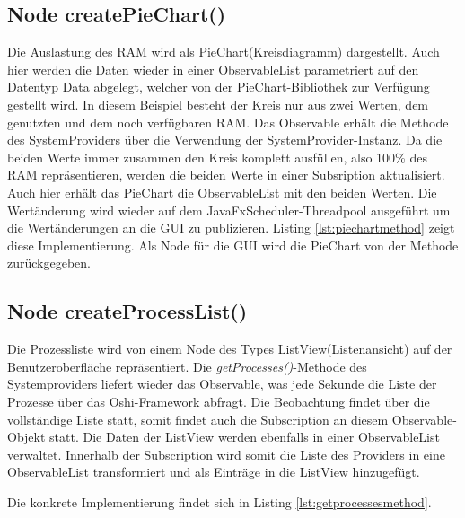 \subsection{Node createPieChart()}
Die Auslastung des RAM wird als PieChart(Kreisdiagramm) dargestellt. Auch hier werden die Daten wieder in einer ObservableList parametriert auf den Datentyp Data abgelegt, welcher von der PieChart-Bibliothek zur Verfügung gestellt wird. In diesem Beispiel besteht der Kreis nur aus zwei Werten, dem genutzten und dem noch verfügbaren RAM. Das Observable erhält die Methode des SystemProviders über die Verwendung der SystemProvider-Instanz. Da die beiden Werte immer zusammen den Kreis komplett ausfüllen, also 100\% des RAM repräsentieren, werden die beiden Werte in einer Subsription aktualisiert. Auch hier erhält das PieChart die ObservableList mit den beiden Werten. Die Wertänderung wird wieder auf dem JavaFxScheduler-Threadpool ausgeführt um die Wertänderungen an die GUI zu publizieren. Listing \ref{lst:piechartmethod} zeigt diese Implementierung. Als Node für die GUI wird die PieChart von der Methode zurückgegeben.
 
\subsection{Node createProcessList()}
Die Prozessliste wird von einem Node des Types ListView(Listenansicht) auf der Benutzeroberfläche repräsentiert. Die \textit{getProcesses()}-Methode des Systemproviders liefert wieder das Observable, was jede Sekunde die Liste der Prozesse über das Oshi-Framework abfragt. Die Beobachtung findet über die vollständige Liste statt, somit findet auch die Subscription an diesem Observable-Objekt statt. Die Daten der ListView werden ebenfalls in einer ObservableList verwaltet. Innerhalb der Subscription wird somit die Liste des Providers in eine ObservableList transformiert und als Einträge in die ListView hinzugefügt. 

Die konkrete Implementierung findet sich in Listing \ref{lst:getprocessesmethod}.
